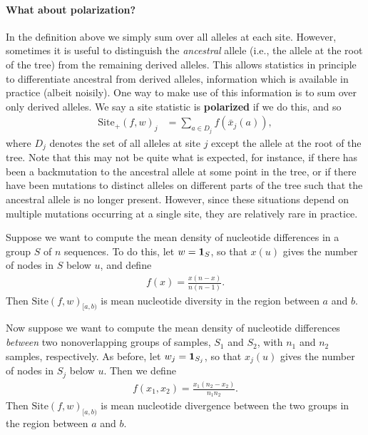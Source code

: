 \documentclass{article}
\newcommand{\site}{\mbox{Site}} %
\newcommand{\sitep}{\mbox{Site}_+} %
\newcommand{\iw}{w} %
\newcommand{\nw}{x} %
\newcommand{\aw}{{\bar x}} %
\begin{document}
\paragraph{What about polarization?}
In the definition above we simply sum over all alleles at each site.
However, sometimes it is useful to distinguish the \emph{ancestral} allele
(i.e., the allele at the root of the tree) from the remaining derived alleles.
This allows statistics in principle to differentiate ancestral from derived alleles,
information which is available in practice (albeit noisily).
One way to make use of this information is to sum over only derived alleles.
We say a site statistic is \textbf{polarized} if we do this,
and so
\begin{align} \label{eqn:site_unpolarized}
    \sitep(f, \iw)_j
    &=
    \sum_{a \in D_j} f(\aw_j(a)) ,
\end{align}
where $D_j$ denotes the set of all alleles at site $j$ except the allele at the root of the tree.
Note that this may not be quite what is expected,
for instance, if there has been a backmutation to the ancestral allele at some point in the tree,
or if there have been mutations to distinct alleles on different parts of the tree
such that the ancestral allele is no longer present.
However, since these situations depend on multiple mutations occurring at a single site,
they are relatively rare in practice.

\begin{example} \label{ex:site_diversity}
    Suppose we want to compute the mean density of nucleotide differences
    in a group $S$ of $n$ sequences.
    To do this,
    let $\iw = \bone_S$,
    so that $\nw(u)$ gives the number of nodes in $S$ below $u$,
    and define
    \begin{align*}
        f(x) = \frac{x (n - x)}{n (n-1)} .
    \end{align*}
    Then $\site(f, \iw)_{[a,b)}$ is mean nucleotide diversity in the region between $a$ and $b$.
\end{example}

\begin{example} \label{ex:site_divergence}
    Now suppose we want to compute the mean density of nucleotide differences
    \emph{between} two nonoverlapping groups of samples, $S_1$ and $S_2$,
    with $n_1$ and $n_2$ samples, respectively.
    As before,
    let $\iw_j = \bone_{S_j}$,
    so that $\nw_{j}(u)$ gives the number of nodes in $S_j$ below $u$.
    Then we define
    \begin{align*}
        f(x_1, x_2) = \frac{x_1 (n_2 - x_2)}{n_1 n_2} .
    \end{align*}
    Then $\site(f, \iw)_{[a,b)}$ is mean nucleotide divergence between the two groups
    in the region between $a$ and $b$.
\end{example}
\end{document}
